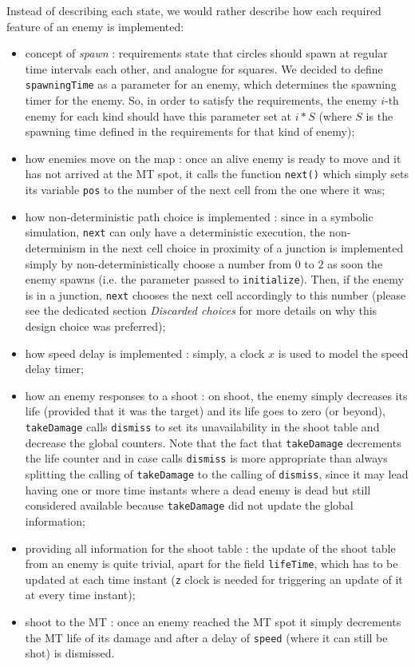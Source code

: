 \documentclass[
10pt, %
a4paper, %
oneside, %
headinclude,footinclude, %
BCOR5mm, %
]{scrartcl}
\begin{document}
Instead of describing each state, we would rather describe how each required feature of an enemy is implemented:
\begin{itemize}
	\item concept of \emph{spawn} : requirements state that circles should spawn at regular time intervals each other, and analogue for squares. We decided to define \texttt{spawningTime} as a parameter for an enemy, which determines the spawning timer for the enemy. So, in order to satisfy the requirements, the enemy $i$-th enemy for each kind should have this parameter set at $i*S$ (where $S$ is the spawning time defined in the requirements for that kind of enemy);
	\item how enemies move on the map : once an alive enemy is ready to move and it has not arrived at the MT spot, it calls the function \texttt{next()} which simply sets its variable \texttt{pos} to the number of the next cell from the one where it was;
	\item how non-deterministic path choice is implemented : since in a symbolic simulation, \texttt{next} can only have a deterministic execution, the non-determinism in the next cell choice in proximity of a junction is implemented simply by non-deterministically choose a number from $0$ to $2$ as soon the enemy spawns (i.e. the parameter passed to \texttt{initialize}). Then, if the enemy is in a junction, \texttt{next} chooses the next cell accordingly to this number (please see the dedicated section \emph{Discarded choices} for more details on why this design choice was preferred);
	\item how speed delay is implemented : simply, a clock $x$ is used to model the speed delay timer;
	\item how an enemy responses to a shoot : on shoot, the enemy simply decreases its life (provided that it was the target) and its life goes to zero (or beyond), \texttt{takeDamage} calls \texttt{dismiss} to set its unavailability in the shoot table and decrease the global counters. Note that the fact that \texttt{takeDamage} decrements the life counter and in case calls \texttt{dismiss} is more appropriate than always splitting the calling of \texttt{takeDamage} to the calling of \texttt{dismiss}, since it may lead having one or more time instants where a dead enemy is dead but still considered available because \texttt{takeDamage} did not update the global information;
	\item providing all information for the shoot table : the update of the shoot table from an enemy is quite trivial, apart for the field \texttt{lifeTime}, which has to be updated at each time instant (\texttt{z} clock is needed for triggering an update of it at every time instant);
	\item shoot to the MT : once an enemy reached the MT spot it simply decrements the MT life of its damage and after a delay of \texttt{speed} (where it can still be shot) is dismissed.
\end{itemize}
\end{document}
